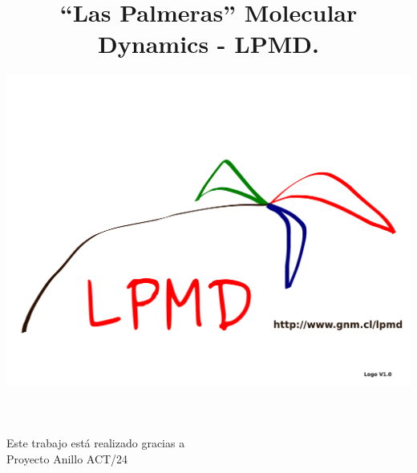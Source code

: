\documentclass[a4paper,10pt]{scrbook}
\begin{document}
\author{\includegraphics[scale=.35]{logo-lpmd.pdf}}
\title{``Las Palmeras'' Molecular Dynamics - \textbf{LPMD}.}
\maketitle
\newpage

\vspace{10cm}
\begin{flushright}
 Este trabajo est\'a realizado gracias a\\
 Proyecto Anillo ACT/24
\end{flushright}

\newpage\pagestyle{empty}\tableofcontents\newpage
\pagestyle{fancy}
\newpage
\end{document}
